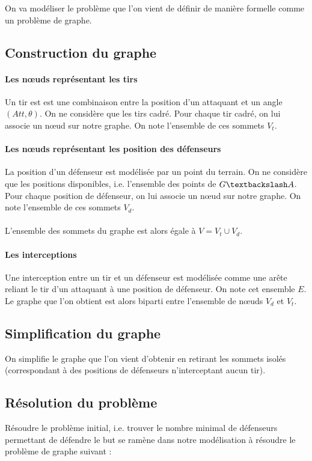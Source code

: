 \documentclass[12pt]{article}
\begin{document}
On va modéliser le problème que l'on vient de définir de manière formelle comme un problème de graphe.

\subsection{Construction du graphe}

\paragraph{Les n\oe uds représentant les tirs}
Un tir est est une combinaison entre la position d'un attaquant et un angle $(Att, \theta)$. On ne considère que les tirs cadré. Pour chaque tir cadré, on lui associe un n\oe ud sur notre graphe. On note l'ensemble de ces sommets $V_t$.

\paragraph{Les n\oe uds représentant les position des défenseurs}
La position d'un défenseur est modélisée par un point du terrain. On ne considère que les positions disponibles, i.e. l'ensemble des points de $G\textbackslash A$. Pour chaque position de défenseur, on lui associe un n\oe ud sur notre graphe. On note l'ensemble de ces sommets $V_d$.

\paragraph{} L'ensemble des sommets du graphe est alors égale à $V = V_t \cup V_d$.

\paragraph{Les interceptions}
Une interception entre un tir et un défenseur est modélisée comme une arête reliant le tir d'un attaquant à une position de défenseur. On note cet ensemble $E$. Le graphe que l'on obtient est alors biparti entre l'ensemble de n\oe uds $V_d$ et $V_t$.

\subsection{Simplification du graphe}
On simplifie le graphe que l'on vient d'obtenir en retirant les sommets isolés (correspondant à des positions de défenseurs n'interceptant aucun tir).

\subsection{Résolution du problème}
Résoudre le problème initial, i.e. trouver le nombre minimal de défenseurs permettant de défendre le but se ramène dans notre modélisation à résoudre le problème de graphe suivant :
\end{document}
